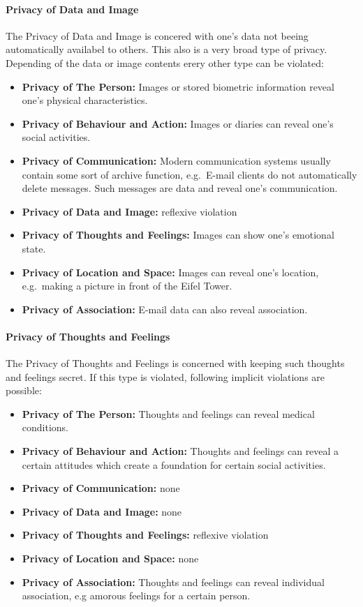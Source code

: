 \paragraph*{Privacy of Data and Image}

The Privacy of Data and Image is concered with one's data not beeing
automatically availabel to others. This also is a very broad type of
privacy. Depending of the data or image contents erery other type can be
violated:

\begin{itemize}

\item
  \textbf{Privacy of The Person:} Images or stored biometric information
  reveal one's physical characteristics.
\item
  \textbf{Privacy of Behaviour and Action:} Images or diaries can reveal
  one's social activities.
\item
  \textbf{Privacy of Communication:} Modern communication systems
  usually contain some sort of archive function, e.g.~E-mail clients do
  not automatically delete messages. Such messages are data and reveal
  one's communication.
\item
  \textbf{Privacy of Data and Image:} reflexive violation
\item
  \textbf{Privacy of Thoughts and Feelings:} Images can show one's
  emotional state.
\item
  \textbf{Privacy of Location and Space:} Images can reveal one's
  location, e.g.~making a picture in front of the Eifel Tower.
\item
  \textbf{Privacy of Association:} E-mail data can also reveal
  association.
\end{itemize}

\paragraph*{Privacy of Thoughts and Feelings}

The Privacy of Thoughts and Feelings is concerned with keeping such
thoughts and feelings secret. If this type is violated, following
implicit violations are possible:

\begin{itemize}

\item
  \textbf{Privacy of The Person:} Thoughts and feelings can reveal
  medical conditions.
\item
  \textbf{Privacy of Behaviour and Action:} Thoughts and feelings can
  reveal a certain attitudes which create a foundation for certain
  social activities.
\item
  \textbf{Privacy of Communication:} none
\item
  \textbf{Privacy of Data and Image:} none
\item
  \textbf{Privacy of Thoughts and Feelings:} reflexive violation
\item
  \textbf{Privacy of Location and Space:} none
\item
  \textbf{Privacy of Association:} Thoughts and feelings can reveal
  individual association, e.g amorous feelings for a certain person.
\end{itemize}

